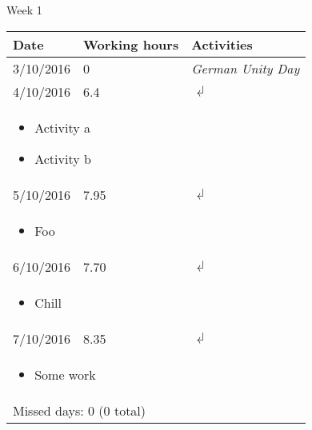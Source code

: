 \begin{table}[!ht]
Week 1
\begin{center}
\begin{tabular}{llp{6cm}}
\toprule
Date & Working hours & Activities\\ 
\midrule 
3/10/2016 & 0 & \textit{German Unity Day} \\ 
4/10/2016 & 6.4 & $\dlsh$ \\ 
\multicolumn{3}{l}{\parbox{135mm}{%
\begin{itemize} 
\item Activity a
\item Activity b
\end{itemize}}} \\ 
5/10/2016 & 7.95 & $\dlsh$ \\ 
\multicolumn{3}{l}{\parbox{135mm}{%
\begin{itemize} 
\item Foo
\end{itemize}}} \\ 
6/10/2016 & 7.70 & $\dlsh$ \\ 
\multicolumn{3}{l}{\parbox{135mm}{%
\begin{itemize} 
\item Chill
\end{itemize}}} \\ 
7/10/2016 & 8.35 & $\dlsh$ \\ 
\multicolumn{3}{l}{\parbox{135mm}{%
\begin{itemize} 
\item Some work
\end{itemize}}} \\ 
\midrule 
\multicolumn{3}{l}{Missed days: 0 (0 total)} \\ 
\bottomrule 
\end{tabular} 
\end{center} 
\end{table} 




